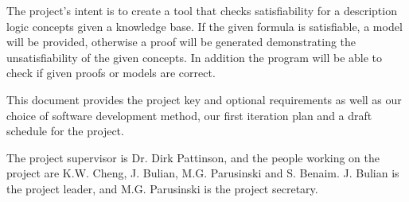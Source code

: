The project's intent is to create a tool that checks satisfiability for a description logic concepts given a knowledge base. If the given formula is satisfiable, a model will be provided, otherwise a proof will be generated demonstrating the unsatisfiability of the given concepts. In addition the program will be able to check if given proofs or models are correct.

This document provides the project key and optional requirements as well as our choice of software development method, our first iteration plan and a draft schedule for the project.

The project supervisor is Dr. Dirk Pattinson, and the people working on the project
are K.W. Cheng, J. Bulian, M.G. Parusinski and S. Benaim. J. Bulian is the project leader, and M.G. Parusinski is the project secretary.
